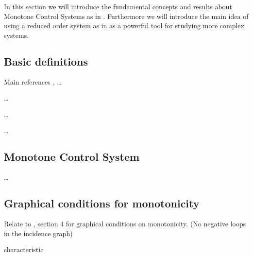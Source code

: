 In this section we will introduce the fundamental concepts and results about Monotone Control Systems as in \cite{angeli2003monotone}. Furthermore we will introduce the main idea of using a reduced order system as in \cite{enciso2005monotone} as a powerful tool for studying more complex systems.
\subsection{Basic definitions}
Main references \cite{smith2008monotone}, \cite{angeli2003monotone}
\dots
\begin{definition}[Cone]
\dots
\end{definition}

\begin{definition}
\dots
\end{definition}

\begin{definition}
\dots
\end{definition}

\subsection{Monotone Control System}

\begin{definition}
\dots
\end{definition}

\subsection{Graphical conditions for monotonicity} Relate to \cite{angeli2004multigraph}, section 4 for graphical conditions on monotonicity. (No negative loops in the incidence graph)


\begin{definition}[I/S] characteristic

\end{definition}
